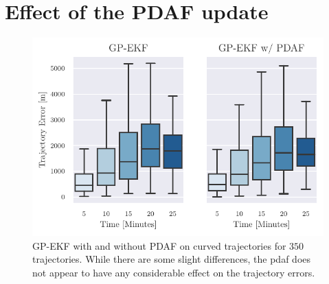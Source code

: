 \section{Effect of the PDAF update}
\begin{figure}[h]
    \centering
    \includegraphics{figures/curved_line_stats/gp_vs_pdaf.pdf}
    \caption{GP-EKF with and without PDAF on curved trajectories for $350$ trajectories. While there are some slight differences, the \acrshort{pdaf} does not appear to have any considerable effect on the trajectory errors.}
    \label{fig:stats_curved_gp_ekf_with_or_without_pdaf}
\end{figure}

